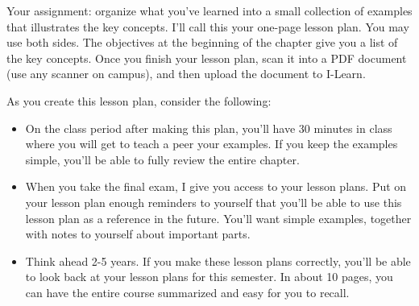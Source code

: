 \begin{problem} 
Your assignment: organize what you've learned into a small collection of examples that illustrates the key concepts. I'll call this your one-page lesson plan. You may use both sides. The objectives at the beginning of the chapter give you a list of the key concepts. Once you finish your lesson plan, scan it into a PDF document (use any scanner on campus), and then upload the document to I-Learn.

As you create this lesson plan, consider the following:
\begin{itemize}
 \item On the class period after making this plan, you'll have 30 minutes in class where you will get to teach a peer your examples. If you keep the examples simple, you'll be able to fully review the entire chapter.
 \item When you take the final exam, I give you access to your lesson plans. Put on your lesson plan enough reminders to yourself that you'll be able to use this lesson plan as a reference in the future.  You'll want simple examples, together with notes to yourself about important parts.
 \item Think ahead 2-5 years. If you make these lesson plans correctly, you'll be able to look back at your lesson plans for this semester. In about 10 pages, you can have the entire course summarized and easy for you to recall.
\end{itemize}
\end{problem}

